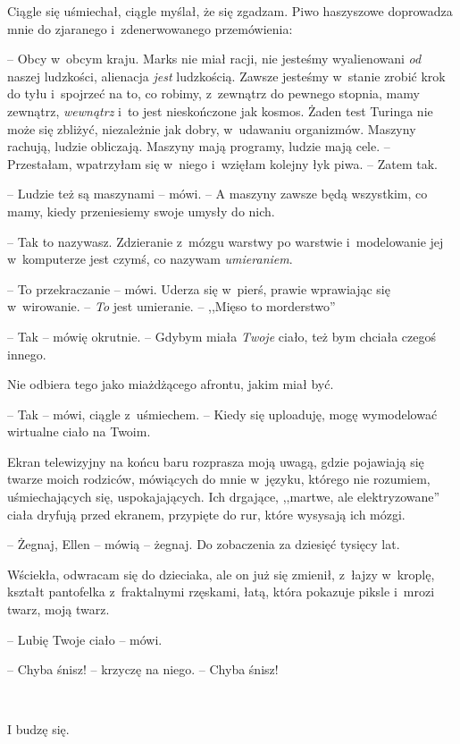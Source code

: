 \documentclass[oneside,polish,11pt,sfheadings]{mwbk}
\begin{document}
Ciągle się uśmiechał, ciągle myślał, że się zgadzam. Piwo haszyszowe
doprowadza mnie do zjaranego i~zdenerwowanego przemówienia: 

-- Obcy w~obcym kraju. Marks nie miał racji, nie jesteśmy wyalienowani \textit{od
}naszej ludzkości, alienacja \textit{jest} ludzkością. Zawsze jesteśmy w~stanie zrobić krok do tyłu i~spojrzeć na to, co robimy, z~zewnątrz do
pewnego stopnia, mamy zewnątrz, \textit{wewnątrz} i~to jest nieskończone
jak kosmos. Żaden test Turinga nie może się zbliżyć, niezależnie jak
dobry, w~udawaniu organizmów. Maszyny rachują, ludzie obliczają. Maszyny
mają programy, ludzie mają cele. -- Przestałam, wpatrzyłam się w~niego i~wzięłam kolejny łyk piwa. -- Zatem tak.

-- Ludzie też są maszynami -- mówi. -- A maszyny zawsze będą wszystkim, co
mamy, kiedy przeniesiemy swoje umysły do nich.

-- Tak to nazywasz. Zdzieranie z~mózgu warstwy po warstwie i~modelowanie
jej w~komputerze jest czymś, co nazywam \textit{umieraniem}.

-- To przekraczanie -- mówi. Uderza się w~pierś, prawie wprawiając się w~wirowanie. -- \textit{To} jest umieranie. -- ,,Mięso to morderstwo''

-- Tak -- mówię okrutnie. -- Gdybym miała \textit{Twoje }ciało, też bym
chciała czegoś innego.

Nie odbiera tego jako miażdżącego afrontu, jakim miał być. 

-- Tak -- mówi,
ciągle z~uśmiechem. -- Kiedy się uploaduję, mogę wymodelować wirtualne
ciało na Twoim.

Ekran telewizyjny na końcu baru rozprasza moją uwagą, gdzie pojawiają
się twarze moich rodziców, mówiących do mnie w~języku, którego nie
rozumiem, uśmiechających się, uspokajających. Ich drgające, ,,martwe,
ale elektryzowane'' ciała dryfują przed ekranem, przypięte do rur, które
wysysają ich mózgi. 

-- Żegnaj, Ellen -- mówią -- żegnaj. Do zobaczenia za
dziesięć tysięcy lat.

Wściekła, odwracam się do dzieciaka, ale on już się zmienił, z~łajzy w~kroplę, kształt pantofelka z~fraktalnymi rzęskami, łatą, która pokazuje
piksle i~mrozi twarz, moją twarz.

-- Lubię Twoje ciało -- mówi.

-- Chyba śnisz! -- krzyczę na niego. -- Chyba śnisz!

~

I budzę się.
\end{document}
